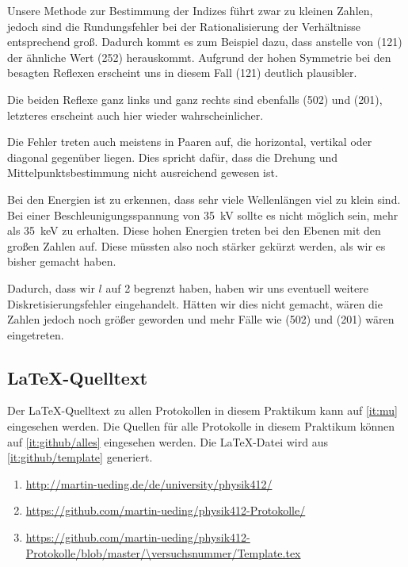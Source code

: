 Unsere Methode zur Bestimmung der Indizes führt zwar zu kleinen Zahlen, jedoch
sind die Rundungsfehler bei der Rationalisierung der Verhältnisse entsprechend
groß. Dadurch kommt es zum Beispiel dazu, dass anstelle von (121) der ähnliche
Wert (252)
herauskommt. Aufgrund der hohen Symmetrie bei den besagten Reflexen erscheint
uns in diesem Fall (121) deutlich plausibler.

Die beiden Reflexe ganz links und ganz rechts sind ebenfalls (502) und (201),
letzteres erscheint auch hier wieder wahrscheinlicher.

Die Fehler treten auch meistens in Paaren auf, die horizontal, vertikal oder
diagonal gegenüber liegen. Dies spricht dafür, dass die Drehung und
Mittelpunktsbestimmung nicht ausreichend gewesen ist.

Bei den Energien ist zu erkennen, dass sehr viele Wellenlängen viel zu klein
sind. Bei einer Beschleunigungsspannung von \SI{35}{\kilo\volt} sollte es
nicht möglich sein, mehr als \SI{35}{\kilo\electronvolt} zu erhalten. Diese
hohen Energien treten bei den Ebenen mit den großen Zahlen auf. Diese müssten
also noch stärker gekürzt werden, als wir es bisher gemacht haben.

Dadurch, dass wir $l$ auf 2 begrenzt haben, haben wir uns eventuell weitere
Diskretisierungsfehler eingehandelt. Hätten wir dies nicht gemacht, wären die
Zahlen jedoch noch größer geworden und mehr Fälle wie (502) und (201) wären
eingetreten.


\FloatBarrier
\begin{appendix}
    \FloatBarrier
    \chapter{\LaTeX-Quelltext}

    Der \LaTeX-Quelltext zu allen Protokollen in diesem Praktikum kann auf
    \ref{it:mu} eingesehen werden. Die Quellen für alle Protokolle in diesem
    Praktikum können auf \ref{it:github/alles} eingesehen werden. Die
    \LaTeX-Datei wird aus \ref{it:github/template} generiert.

    \begin{enumerate}
        \item
            \label{it:mu}
            \url{http://martin-ueding.de/de/university/physik412/}
        \item
            \label{it:github/alles}
            \url{https://github.com/martin-ueding/physik412-Protokolle/}
        \item
            \label{it:github/template}
            \url{https://github.com/martin-ueding/physik412-Protokolle/blob/master/\versuchsnummer/Template.tex}
    \end{enumerate}
\end{appendix}


